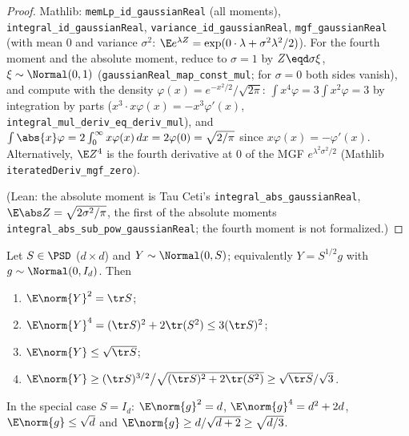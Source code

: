 \begin{proof}
Mathlib: \texttt{memLp\_id\_gaussianReal} (all moments), \texttt{integral\_id\_gaussianReal},
\texttt{variance\_id\_gaussianReal}, \texttt{mgf\_gaussianReal} (with mean $0$ and variance
$\sigma^2$: $\E e^{\lambda Z} = \exp(0\cdot\lambda + \sigma^2\lambda^2/2)$). For the fourth
moment and the absolute moment, reduce to $\sigma = 1$ by $Z \eqd \sigma\xi$,
$\xi \sim \Normal(0,1)$ (\texttt{gaussianReal\_map\_const\_mul}; for $\sigma = 0$ both sides
vanish), and compute with the density $\varphi(x) = e^{-x^2/2}/\sqrt{2\pi}$:
$\int x^4\varphi = 3\int x^2\varphi = 3$ by integration by parts
($x^3\cdot x\varphi(x) = -x^3\varphi'(x)$, \texttt{integral\_mul\_deriv\_eq\_deriv\_mul}), and
$\int\abs{x}\varphi = 2\int_0^\infty x\varphi(x)\,dx = 2\varphi(0) = \sqrt{2/\pi}$ since
$x\varphi(x) = -\varphi'(x)$. Alternatively, $\E Z^4$ is the fourth derivative at $0$ of the
MGF $e^{\lambda^2\sigma^2/2}$ (Mathlib \texttt{iteratedDeriv\_mgf\_zero}).

(Lean: the absolute moment is Tau Ceti's \texttt{integral\_abs\_gaussianReal},
$\E\abs Z = \sqrt{2\sigma^2/\pi}$, the first of the absolute moments
\texttt{integral\_abs\_sub\_pow\_gaussianReal}; the fourth moment is not formalized.)
\end{proof}

\begin{lemma}\label{lem:gauss_norm_moments}
Let $S \in \PSD$ ($d \times d$) and $Y \sim \Normal(0, S)$; equivalently $Y = S^{1/2}g$ with
$g \sim \Normal(0,I_d)$. Then
\begin{enumerate}
  \item[(i)] $\E\norm{Y}^2 = \tr S$;
  \item[(ii)] $\E\norm{Y}^4 = (\tr S)^2 + 2\tr(S^2) \le 3(\tr S)^2$;
  \item[(iii)] $\E\norm{Y} \le \sqrt{\tr S}$;
  \item[(iv)] $\E\norm{Y} \ge (\tr S)^{3/2}\big/\sqrt{(\tr S)^2 + 2\tr(S^2)} \ge \sqrt{\tr S}/\sqrt3$.
\end{enumerate}
In the special case $S = I_d$: $\E\norm{g}^2 = d$, $\E\norm{g}^4 = d^2 + 2d$,
$\E\norm{g} \le \sqrt d$ and $\E\norm{g} \ge d/\sqrt{d+2} \ge \sqrt{d/3}$.
\end{lemma}

